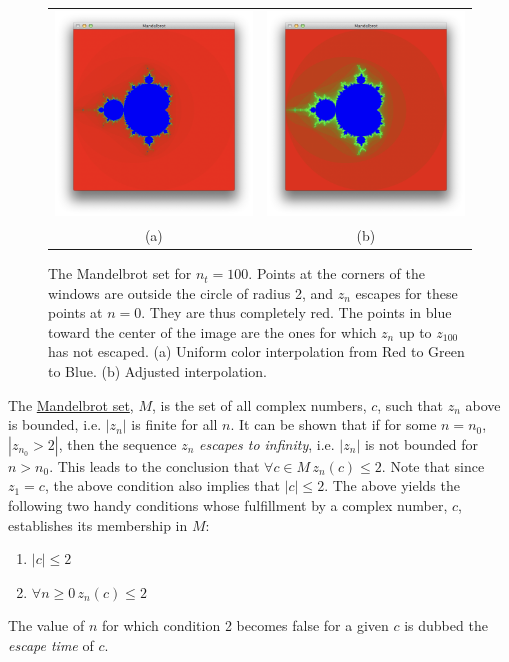 \documentclass[addpoints]{exam}
\begin{document}
\begin{questions}
  \begin{figure}
    \centering
    \begin{tabular}{cc}
      \includegraphics[width=.47\linewidth]{mandelbrot1}& \includegraphics[width=.47\linewidth]{mandelbrot2}\\
      (a) & (b)
    \end{tabular}
    \label{fig:mandel}
    \caption{The Mandelbrot set for $n_t = 100$. Points at the corners of the windows are outside the circle of radius 2, and $z_n$ escapes for these points at $n=0$. They are thus completely red. The points in blue toward the center of the image are the ones for which $z_n$ up to $z_{100}$ has not escaped. (a) Uniform color interpolation from Red to Green to Blue. (b) Adjusted interpolation.}
  \end{figure}
  
The \href{http://en.wikipedia.org/wiki/Mandelbrot_set}{Mandelbrot set}, $M$, is the set of all complex numbers, $c$, such that $z_n$ above is bounded, i.e. $|z_n|$ is finite for all $n$. It can be shown that if for some $n = n_0$, $|z_{n_0} > 2|$, then the sequence $z_n$ {\it escapes to infinity}, i.e. $|z_n|$ is not bounded for $n > n_0$. This leads to the conclusion that $\forall c \in M\, z_n(c) \leq 2$. Note that since $z_1 = c$, the above condition also implies that $|c| \leq 2$.
The above yields the following two handy conditions whose fulfillment by a complex number, $c$, establishes its membership in $M$:
\begin{enumerate}
\item $|c|\leq 2$
\item $\forall n\geq 0\, z_n(c)\leq 2$
\end{enumerate}
The value of $n$ for which condition 2 becomes false for a given $c$ is dubbed the {\it escape time} of $c$.


\end{questions}
\end{document}
